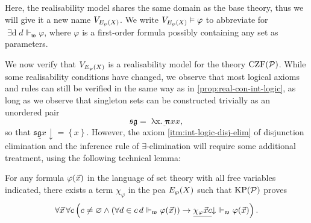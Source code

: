 \documentclass[12pt,openany]{book}
\theoremstyle{plain}
\theoremstyle{definition}
\newcommand\opA[1]{\mathop{\forall #1}}
\newcommand\opE[1]{\mathop{\exists #1}}
\newcommand\oplam[1]{\mathop{\lambda #1.}}
\newcommand\Pow{\mathcal{P}}
\newcommand\KPP{\mathrm{KP}\mleft(\Pow\mright)}
\newcommand\CZFP{\mathrm{CZF}\mleft(\Pow\mright)}
\begin{document}
Here, the realisability model shares the same domain as the base theory, thus we will give it a new name $V_{E_\wp\mleft(X\mright)}$. We write $V_{E_\wp\mleft(X\mright)} \vDash \varphi$ to abbreviate for $\opE{d} d \Vdash_\mathfrak{w} \varphi$, where $\varphi$ is a first-order formula possibly containing any set as parameters.

We now verify that $V_{E_\wp\mleft(X\mright)}$ is a realisability model for the theory $\CZFP$. While some realisability conditions have changed, we observe that most logical axioms and rules can still be verified in the same way as in \autoref{prop:real-con-int-logic}, as long as we observe that singleton sets can be constructed trivially as an unordered pair
\[\mathfrak{sg} = \underline{\oplam{x} \bm{\pi} xx},\]
so that $\underline{\mathfrak{sg} x} {\downarrow} = \left\{x\right\}$. However, the axiom \ref{itm:int-logic-disj-elim} of disjunction elimination and the inference rule of $\exists$-elimination will require some additional treatment, using the following technical lemma:
\begin{lemma}
  For any formula $\varphi\mleft(\vec{x}\mright)$ in the language of set theory with all free variables indicated, there exists a term $\chi_\varphi$ in the pca $E_\wp\mleft(X\mright)$ such that $\KPP$ proves
  \[\opA{\vec{x}} \opA{c} \left(c \neq \varnothing \land \left(\opA{d \in c} d \Vdash_\mathfrak{w} \varphi\mleft(\vec{x}\mright)\right) \rightarrow \underline{\chi_\varphi \vec{x} c} {\downarrow} \Vdash_\mathfrak{w} \varphi\mleft(\vec{x}\mright)\right).\]
\end{lemma}
\end{document}
